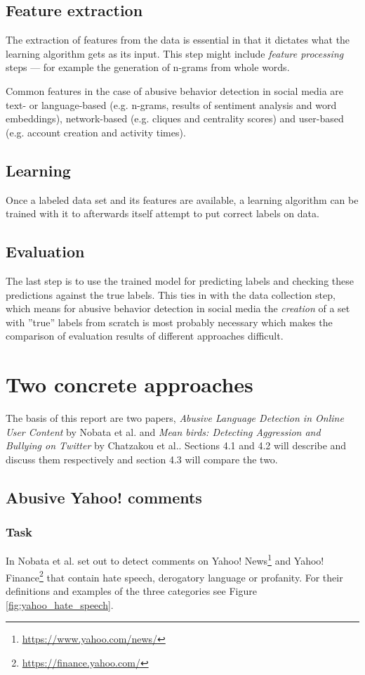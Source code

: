 \documentclass{proseminar}
\begin{document}
\subsection{Feature extraction}
The extraction of features from the data is essential in that it dictates what the learning algorithm gets as its input. This step might include \emph{feature processing} steps --- for example the generation of n-grams from whole words.

Common features in the case of abusive behavior detection in social media are text- or language-based (e.g. n-grams, results of sentiment analysis and word embeddings), network-based (e.g. cliques and centrality scores) and user-based (e.g. account creation and activity times).

\subsection{Learning}
Once a labeled data set and its features are available, a learning algorithm can be trained with it to afterwards itself attempt to put correct labels on data.

\subsection{Evaluation}
The last step is to use the trained model for predicting labels and checking these predictions against the true labels. This ties in with the data collection step, which means for abusive behavior detection in social media the \emph{creation} of a set with ''true'' labels from scratch is most probably necessary which makes the comparison of evaluation results of different approaches difficult.

\section{Two concrete approaches}
The basis of this report are two papers, \emph{Abusive Language Detection in Online User Content} by Nobata et al.\cite{Yahoo:2016} and \emph{Mean birds: Detecting Aggression and Bullying on Twitter} by Chatzakou et al.\cite{Twitter:2017}. Sections 4.1 and 4.2 will describe and discuss them respectively and section 4.3 will compare the two.

\subsection{Abusive Yahoo! comments}
\subsubsection{Task}
In \cite{Yahoo:2016} Nobata et al. set out to detect comments on Yahoo! News\footnote{\url{https://www.yahoo.com/news/}} and Yahoo! Finance\footnote{\url{https://finance.yahoo.com/}} that contain hate speech, derogatory language or profanity. For their definitions and examples of the three categories see Figure \ref{fig:yahoo_hate_speech}.
\end{document}
